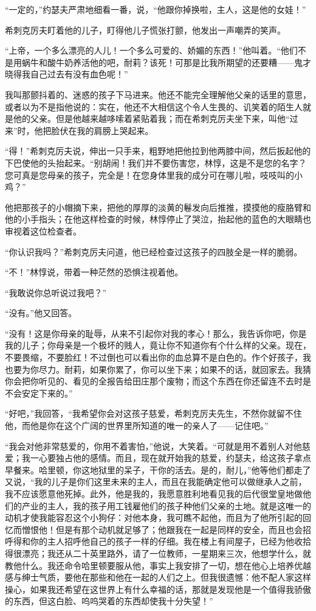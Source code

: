 \par “一定的，”约瑟夫严肃地细看一番，说，“他跟你掉换啦，主人，这是他的女娃！”
\par 希刺克厉夫盯着他的儿子，盯得他儿子慌张打颤，他发出一声嘲弄的笑声。
\par “上帝，一个多么漂亮的人儿！一个多么可爱的、娇媚的东西！”他叫着。“他们不是用蜗牛和酸牛奶养活他的吧，耐莉？该死！可那是比我所期望的还要糟——鬼才晓得我自己过去有没有血色呢！”
\par 我叫那颤抖着的、迷惑的孩子下马进来。他还不能完全理解他父亲的话里的意思，或者以为不是指他说的：实在，他还不大相信这个令人生畏的、讥笑着的陌生人就是他的父亲。但是他越来越哆嗦着紧贴着我；而在希刺克厉夫坐下来，叫他“过来”时，他把脸伏在我的肩膀上哭起来。
\par “得！”希刺克厉夫说，伸出一只手来，粗野地把他拉到他两膝中间，然后扳起他的下巴使他的头抬起来。“别胡闹！我们并不要伤害您，林惇，这是不是您的名字？您可真是您母亲的孩子，完全是！在您身体里我的成分可在哪儿啦，吱吱叫的小鸡？”
\par 他把那孩子的小帽摘下来，把他的厚厚的淡黄的鬈发向后推推，摸摸他的瘦胳臂和他的小手指头；在他这样检查的时候，林惇停止了哭泣，抬起他的蓝色的大眼睛也审视着这位检查者。
\par “你认识我吗？”希刺克厉夫问道，他已经检查过这孩子的四肢全是一样的脆弱。
\par “不！”林惇说，带着一种茫然的恐惧注视着他。
\par “我敢说你总听说过我吧？”
\par “没有。”他又回答。
\par “没有！这是你母亲的耻辱，从来不引起你对我的孝心！那么，我告诉你吧，你是我的儿子；你母亲是一个极坏的贱人，竟让你不知道你有个什么样的父亲。现在，不要畏缩，不要脸红！不过倒也可以看出你的血总算不是白色的。作个好孩子，我也要为你尽力。耐莉，如果你累了，你可以坐下来；如果不的话，就回家去。我猜你会把你听见的、看见的全报告给田庄那个废物；而这个东西在你还留连不去时是不会安定下来的。”
\par “好吧，”我回答，“我希望你会对这孩子慈爱，希刺克厉夫先生，不然你就留不住他，而他是你在这个广阔的世界里所知道的唯一的亲人了——记住吧。”
\par “我会对他非常慈爱的，你用不着害怕，”他说，大笑着。“可就是用不着别人对他慈爱；我一心要独占他的感情。而且，现在就开始我的慈爱，约瑟夫，给这孩子拿点早餐来。哈里顿，你这地狱里的呆子，干你的活去。是的，耐儿，”他等他们都走了又说，“我的儿子是你们这里未来的主人，而且在我能确定他可以做继承人之前，我不应该愿意他死掉。此外，他是我的，我愿意胜利地看见我的后代很堂皇地做他们的产业的主人，我的孩子用工钱雇他们的孩子种他们父亲的土地。就是这唯一的动机才使我能容忍这个小狗仔：对他本身，我可瞧不起他，而且为了他所引起的回忆而憎恨他！但是有那个动机就足够了；他跟我在一起是同样的安全，而且也会招呼得和你的主人招呼他自己的孩子一样的仔细。我在楼上有间屋子，已经为他收拾得很漂亮；我还从二十英里路外，请了一位教师，一星期来三次，他想学什么，就教他什么。我还命令哈里顿要服从他，事实上我安排了一切，想在他心上培养优越感与绅士气质，要他在那些和他在一起的人们之上。但我很遗憾：他不配人家这样操心，如果我还希望在这世界上有什么幸福的话，那就是发现他是一个值得我骄傲的东西，但这白脸、呜呜哭着的东西却使我十分失望！”

